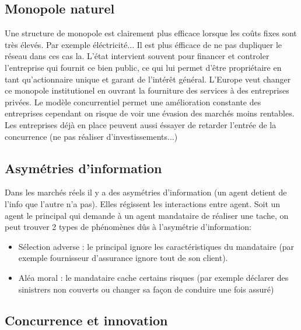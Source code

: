 \subsection{Monopole naturel} %
\label{sec:monopole_naturel}

Une structure de monopole est clairement plus efficace lorsque les coûts fixes sont très élevés. Par exemple éléctricité... Il est plus éfficace de ne pas dupliquer le réseau dans ces cas la. L'état intervient souvent pour financer et controler l'entreprise qui fournit ce bien public, ce qui lui permet d'être propriétaire en tant qu'actionnaire unique et garant de l'intérêt général. L'Europe veut changer ce monopole institutionel en ouvrant la fourniture des services à des entreprises privées. Le modèle concurrentiel permet une amélioration constante des entreprises cependant on risque de voir une évasion des marchés moins rentables. Les entreprises déjà en place peuvent aussi éssayer de retarder l'entrée de la concurrence (ne pas réaliser d'investissements...)


\subsection{Asymétries d'information} %
\label{sec:asymetries_d_information}

Dans les marchés réels il y a des asymétries d'information (un agent detient de l'info que l'autre n'a pas). Elles régissent les interactions entre agent. Soit un agent le principal qui demande à un agent mandataire de réaliser une tache, on peut trouver 2 types de phénomènes dûs à l'asymétrie d'information:
\begin{itemize}
	\item Sélection adverse : le principal ignore les caractéristiques du mandataire (par exemple fournisseur d'assurance ignore tout de son client).
	\item Aléa moral : le mandataire cache certains risques (par exemple déclarer des sinistrers non couverts ou changer sa façon de conduire une fois assuré)
\end{itemize}
\subsection{Concurrence et innovation} %
\label{sec:concurrence_et_innovation}

